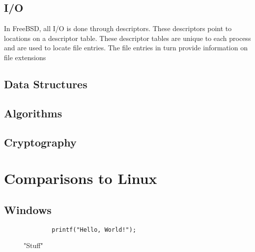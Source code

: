 \documentclass[10pt,draftclsnofoot,onecolumn,compsoc]{IEEEtran}
\begin{document}
	\subsection{I/O}
	
	In FreeBSD, all I/O is done through descriptors. These descriptors point to locations on a descriptor table. These descriptor tables are unique to each process and are used to locate file entries. The file entries in turn provide information on file extensions
	
	\subsection{Data Structures}
	
	\subsection{Algorithms}
	
	\subsection{Cryptography}

	\section{Comparisons to Linux}
	
	\subsection{Windows}
	
	
	
	
	\begin{figure}[H]
		\caption{"Stuff"}
		\begin{lstlisting}
		printf("Hello, World!");
		\end{lstlisting}
	\end{figure}

	

\end{document}
